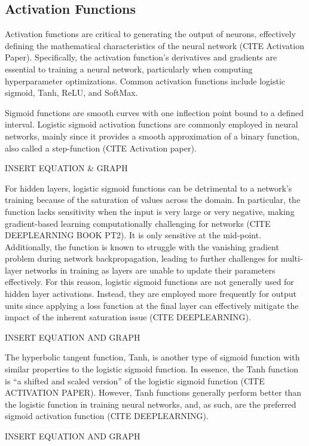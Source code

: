 \documentclass{article}
\begin{document}
\subsection{Activation Functions}
Activation functions are critical to generating the output of neurons, effectively defining the mathematical characteristics of the neural network (CITE Activation Paper). Specifically, the activation function’s derivatives and gradients are essential to training a neural network, particularly when computing hyperparameter optimizations. Common activation functions include logistic sigmoid, Tanh, ReLU, and SoftMax. 

Sigmoid functions are smooth curves with one inflection point bound to a defined interval. Logistic sigmoid activation functions are commonly employed in neural networks, mainly since it provides a smooth approximation of a binary function, also called a step-function (CITE Activation paper). 

INSERT EQUATION \& GRAPH

For hidden layers, logistic sigmoid functions can be detrimental to a network’s training because of the saturation of values across the domain. In particular, the function lacks sensitivity when the input is very large or very negative, making gradient-based learning computationally challenging for networks (CITE DEEPLEARNING BOOK PT2). It is only sensitive at the mid-point. Additionally, the function is known to struggle with the vanishing gradient problem during network backpropagation, leading to further challenges for multi-layer networks in training as layers are unable to update their parameters effectively. For this reason, logistic sigmoid functions are not generally used for hidden layer activations. Instead, they are employed more frequently for output units since applying a loss function at the final layer can effectively mitigate the impact of the inherent saturation issue (CITE DEEPLEARNING). 

INSERT EQUATION AND GRAPH

The hyperbolic tangent function, Tanh, is another type of sigmoid function with similar properties to the logistic sigmoid function. In essence, the Tanh function is “a shifted and scaled version” of the logistic sigmoid function (CITE ACTIVATION PAPER). However, Tanh functions generally perform better than the logistic function in training neural networks, and, as such, are the preferred sigmoid activation function (CITE DEEPLEARNING).  

INSERT EQUATION AND GRAPH
\end{document}
